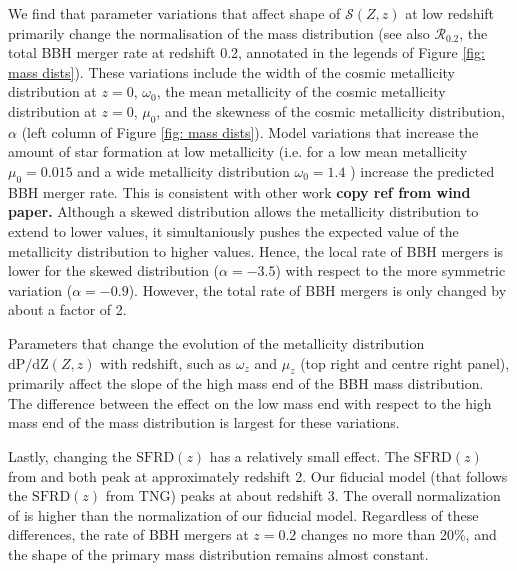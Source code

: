 \documentclass[twocolumn]{aastex631}
\newcommand{\SFRDzZ}{\ensuremath{\mathcal{S}(Z,z)}\xspace}
\newcommand{\SFRDz}{\ensuremath{\mathrm{SFRD}(z)}\xspace}
\newcommand{\dpdZ}{\ensuremath{\mathrm{dP/dZ}(Z,z)}\xspace}
\newcommand{\todo}[1]{{\color{purple}\bf{#1}}}
\begin{document}
We find that parameter variations that affect shape of \SFRDzZ at low redshift primarily change the normalisation of the mass distribution (see also  $\mathcal{R}_{0.2}$, the total BBH merger rate at redshift 0.2, annotated in the legends of Figure \ref{fig: mass dists}). 
These variations include the width of the cosmic metallicity distribution at $z=0$, $\omega_0$, the mean metallicity of the cosmic metallicity distribution at $z=0$, $\mu_0$, and the skewness of the cosmic metallicity distribution, $\alpha$ (left column of Figure \ref{fig: mass dists}).
Model variations that increase the amount of star formation at low metallicity (i.e. for a low mean metallicity $\mu_0=0.015$ and a wide metallicity distribution $\omega_0 = 1.4$ ) increase the predicted BBH merger rate. This is consistent with other work \todo{copy ref from wind paper.}
Although a skewed distribution allows the metallicity distribution to extend to lower values, it simultaniously pushes the expected value of the metallicity distribution to higher values. Hence, the local rate of BBH mergers is lower for the skewed distribution ($\alpha = -3.5$) with respect to the more symmetric variation ($\alpha = -0.9$). However, the total rate of BBH mergers is only changed by about a factor of 2. 


Parameters that change the evolution of the metallicity distribution \dpdZ with redshift, such as $\omega_z$ and $\mu_z$ (top right and centre right panel), primarily affect the slope of the high mass end of the BBH mass distribution.
The difference between the effect on the low mass end with respect to the high mass end of the mass distribution is largest for these variations.


Lastly, changing the \SFRDz has a relatively small effect. 
The \SFRDz from \cite{Madau+2017} and \cite{Neijssel+2019} both peak at approximately redshift 2. Our fiducial model (that follows the \SFRDz from TNG) peaks at about redshift 3. The overall normalization of \cite{Neijssel+2019} is higher than the normalization of our fiducial model. Regardless of these differences, the rate of BBH mergers at $z=0.2$ changes no more than 20\%, and the shape of the primary mass distribution remains almost constant. 
\end{document}
